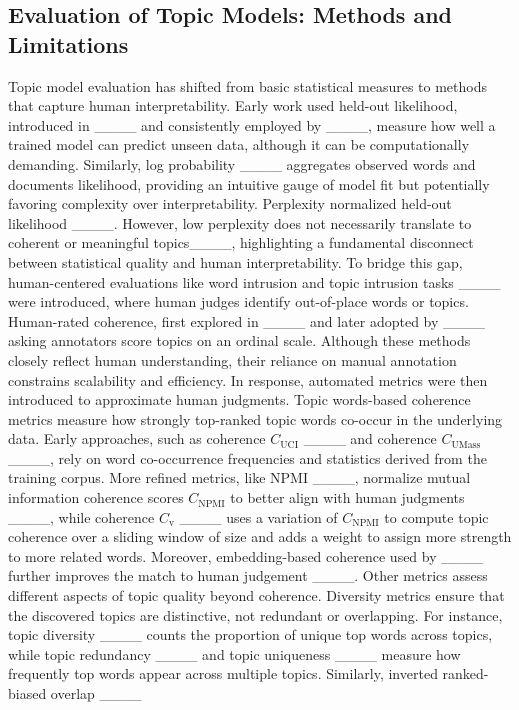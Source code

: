 \subsection{Evaluation of Topic Models: Methods and Limitations}
Topic model evaluation has shifted from basic statistical measures to methods that capture human interpretability. Early work used held-out likelihood, introduced in ____ 
and consistently employed by  
____,
measure how well a trained model can predict unseen data, although it can be computationally demanding. Similarly, log probability 
____ 
aggregates observed words and documents likelihood, providing an intuitive gauge of model fit but potentially favoring complexity over interpretability. Perplexity normalized held-out likelihood ____.
However, low perplexity does not necessarily translate to coherent or meaningful topics____, 
highlighting a fundamental disconnect between statistical quality and human interpretability.
To bridge this gap, human-centered evaluations like word intrusion and topic intrusion tasks ____
were introduced, where human judges identify out-of-place words or topics. Human-rated coherence, first explored in
____ 
and later adopted by 
____ 
asking annotators score topics on an ordinal scale. Although these methods closely reflect human understanding, their reliance on manual annotation constrains scalability and efficiency.
In response, automated metrics were then introduced to approximate human judgments. Topic words-based coherence metrics measure how strongly top-ranked topic words co-occur in the underlying data. Early approaches, such as coherence $C_{\text{UCI}}$ ____
and coherence $C_{\text{UMass}}$ ____,
rely on word co-occurrence frequencies and statistics derived from the training corpus. More refined metrics, like NPMI ____, normalize mutual information coherence scores $C_{\text{NPMI}}$ to better align with human judgments ____,
while coherence $C_{\text{v}}$ ____ 
uses a variation of $C_{\text{NPMI}}$ to compute topic coherence over a sliding window of size and adds a weight to assign more strength to more related words. Moreover, embedding-based coherence used by ____ further improves the match to human judgement ____.
Other metrics assess different aspects of topic quality beyond coherence. Diversity metrics ensure that the discovered topics are distinctive, not redundant or overlapping. For instance, topic diversity ____ 
counts the proportion of unique top words across topics, while topic redundancy ____ 
and topic uniqueness ____ 
measure how frequently top words appear across multiple topics. Similarly, inverted ranked-biased overlap ____ 
